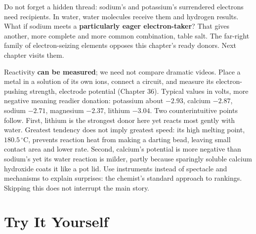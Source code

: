 Do not forget a hidden thread: sodium's and potassium's surrendered electrons need recipients. In water, water molecules receive them and hydrogen results. What if sodium meets a \textbf{particularly eager electron-taker}? That gives another, more complete and more common combination, table salt. The far-right family of electron-seizing elements opposes this chapter's ready donors. Next chapter visits them.

\begin{tiaozhan}
Reactivity \textbf{can be measured}; we need not compare dramatic videos. Place a metal in a solution of its own ions, connect a circuit, and measure its electron-pushing strength, electrode potential (Chapter 36). Typical values in volts, more negative meaning readier donation: potassium about $-2.93$, calcium $-2.87$, sodium $-2.71$, magnesium $-2.37$, lithium $-3.04$. Two counterintuitive points follow. First, lithium is the strongest donor here yet reacts most gently with water. Greatest tendency does not imply greatest speed: its high melting point, $180.5\,^{\circ}\mathrm{C}$, prevents reaction heat from making a darting bead, leaving small contact area and lower rate. Second, calcium's potential is more negative than sodium's yet its water reaction is milder, partly because sparingly soluble calcium hydroxide coats it like a pot lid. Use instruments instead of spectacle and mechanisms to explain surprises: the chemist's standard approach to rankings. Skipping this does not interrupt the main story.
\end{tiaozhan}

\section*{Try It Yourself}

